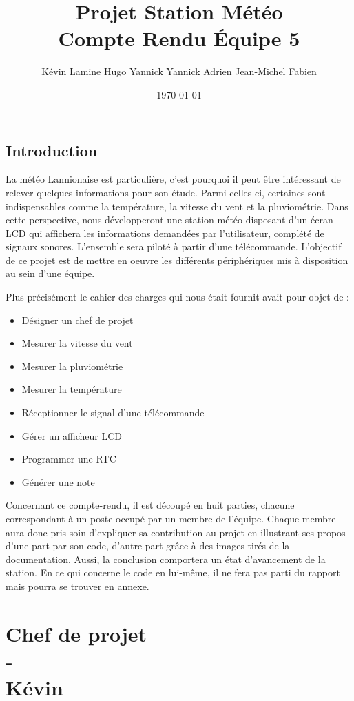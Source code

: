 \documentclass[a4paper]{report}
\title{Projet Station Météo\\Compte Rendu Équipe 5}
\author{Kévin \bsc{Vythelingum} \cr Lamine \bsc{Saidoun} \cr Hugo \bsc{Vérité} \cr Yannick \bsc{Larvor} \cr Yannick \bsc{Riou} \cr Adrien \bsc{Coudray} \cr Jean-Michel \bsc{Nokaya} \cr Fabien \bsc{Jaraczewski}}
\date{\today}
\begin{document}
\maketitle
\tableofcontents

\chapter*{Introduction}
La météo Lannionaise est particulière, c'est pourquoi il peut être intéressant de relever quelques informations pour son étude.
Parmi celles-ci, certaines sont indispensables comme la température, la vitesse du vent et la pluviométrie.
Dans cette perspective, nous développeront une station météo disposant d'un écran LCD qui affichera les informations demandées par l'utilisateur, complété de signaux sonores.
L'ensemble sera piloté à partir d'une télécommande.
L'objectif de ce projet est de mettre en oeuvre les différents périphériques mis à disposition au sein d'une équipe.

Plus précisément le cahier des charges qui nous était fournit avait pour objet de :
\begin{itemize}
\item Désigner un chef de projet
\item Mesurer la vitesse du vent
\item Mesurer la pluviométrie
\item Mesurer la température
\item Réceptionner le signal d'une télécommande
\item Gérer un afficheur LCD
\item Programmer une RTC
\item Générer une note
\end{itemize}

Concernant ce compte-rendu, il est découpé en huit parties, chacune correspondant à un poste occupé par un membre de l'équipe.
Chaque membre aura donc pris soin d'expliquer sa contribution au projet en illustrant ses propos d'une part par son code, d'autre part grâce à des images tirés de la documentation.
Aussi, la conclusion comportera un état d'avancement de la station.
En ce qui concerne le code en lui-même, il ne fera pas parti du rapport mais pourra se trouver en annexe.

\part{Chef de projet\\-\\Kévin }
\end{document}

